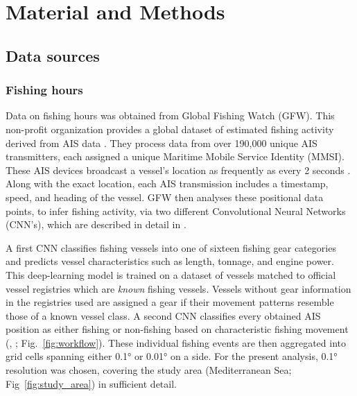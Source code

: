 \chapter{Material and Methods}

\section{Data sources}
\subsection{Fishing hours}
Data on fishing hours was obtained from Global Fishing Watch (GFW). This non-profit organization
provides a global dataset of estimated fishing activity derived from AIS data \citep{gfw_dataset}.
They process data from over 190,000 unique AIS transmitters, each assigned a unique Maritime Mobile
Service Identity (MMSI). These AIS devices broadcast a vessel's location as frequently as every 2
seconds \citep{kontasvesselupdate, taconet2019global}. Along with the exact location, each AIS
transmission includes a timestamp, speed, and heading of the vessel. GFW then analyses these
positional data points, to infer fishing activity, via two different Convolutional Neural Networks
(CNN's), which are described in detail in \cite{Kroodsma18}.

\bigskip

A first CNN classifies fishing vessels into one of sixteen fishing gear categories
 and predicts vessel characteristics such as length, tonnage, and
engine power. This deep-learning model is trained on a dataset of vessels matched to official
vessel registries which are \textit{known} fishing vessels. Vessels without gear information in the
registries used are assigned a gear if their movement patterns resemble those of a known vessel
class. A second CNN classifies every obtained AIS position as either fishing or non-fishing based
on characteristic fishing movement (\citeauthor{Kroodsma18}, \citeyear{Kroodsma18};
Fig.~\ref{fig:workflow}). These individual fishing events are then aggregated into grid cells
spanning either 0.1° or 0.01° on a side. For the present analysis, 0.1° resolution was chosen,
covering the study area (Mediterranean Sea; Fig~\ref{fig:study_area}) in sufficient detail.

\bigskip

